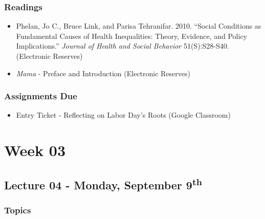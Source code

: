 \documentclass[]{book}
\providecommand{\tightlist}{%
  \setlength{\itemsep}{0pt}\setlength{\parskip}{0pt}}
\begin{document}
\hypertarget{readings-3}{%
\subsubsection*{Readings}\label{readings-3}}

\begin{itemize}
\tightlist
\item
  Phelan, Jo C., Bruce Link, and Parisa Tehranifar. 2010. ``Social Conditions as Fundamental Causes of Health Inequalities: Theory, Evidence, and Policy Implications.'' \emph{Journal of Health and Social Behavior} 51(S):S28-S40. (Electronic Reserves)
\item
  \emph{Mama} - Preface and Introduction (Electronic Reserves)
\end{itemize}

\hypertarget{assignments-due-1}{%
\subsubsection*{Assignments Due}\label{assignments-due-1}}

\begin{itemize}
\tightlist
\item
  Entry Ticket - Reflecting on Labor Day's Roots (Google Classroom)
\end{itemize}

\newpage

\hypertarget{week-03}{%
\section*{Week 03}\label{week-03}}

\hypertarget{lecture-04---monday-september-9th}{%
\subsection*{\texorpdfstring{Lecture 04 - Monday, September 9\textsuperscript{th}}{Lecture 04 - Monday, September 9th}}\label{lecture-04---monday-september-9th}}

\hypertarget{topics-4}{%
\subsubsection*{Topics}\label{topics-4}}
\end{document}
